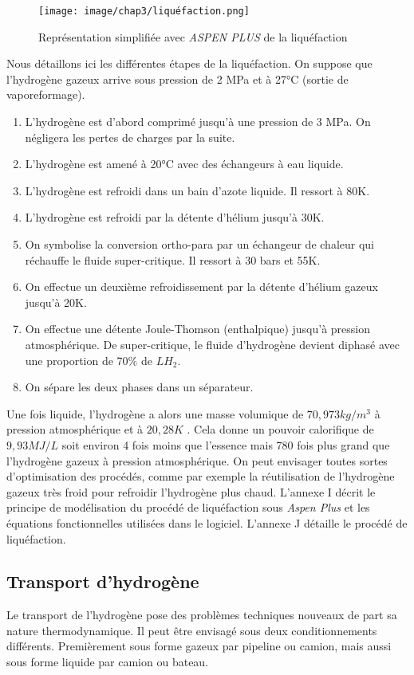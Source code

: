 \documentclass[11pt,french,a4paper]{article}
\begin{document}
\begin{figure}[h!]
\centering
\texttt{[image: image/chap3/liquéfaction.png]}
\caption{Représentation simplifiée avec \textit{ASPEN PLUS} de la liquéfaction}
\end{figure}

Nous détaillons ici les différentes étapes de la liquéfaction. On suppose que l'hydrogène gazeux arrive sous pression de 2 MPa et à 27°C (sortie de vaporeformage).
\begin{enumerate}
\item L'hydrogène est d'abord comprimé jusqu'à une pression de 3 MPa. On négligera les pertes de charges par la suite.
\item L'hydrogène est amené à 20°C avec des échangeurs à eau liquide.
\item L'hydrogène est refroidi dans un bain d'azote liquide. Il ressort à 80K.
\item L'hydrogène est refroidi par la détente d'hélium jusqu'à 30K.
\item On symbolise la conversion ortho-para par un échangeur de chaleur qui réchauffe le fluide super-critique. Il ressort à 30 bars et 55K.
\item On effectue un deuxième refroidissement par la détente d'hélium gazeux jusqu'à 20K.
\item On effectue une détente Joule-Thomson (enthalpique) jusqu'à pression atmosphérique. De super-critique, le fluide d'hydrogène devient diphasé avec une proportion de 70\% de $LH_2$.
\item On sépare les deux phases dans un séparateur.
\end{enumerate}


Une fois liquide, l'hydrogène a alors une masse volumique de $70,973 kg/m^3$ à pression atmosphérique et à $20,28K$ \cite{Surla2019}. Cela donne un pouvoir calorifique de $9,93 MJ/L$ soit environ 4 fois moins que l'essence mais 780 fois plus grand que l'hydrogène gazeux à pression atmosphérique. On peut envisager toutes sortes d'optimisation des procédés, comme par exemple la réutilisation de l'hydrogène gazeux très froid pour refroidir l'hydrogène plus chaud. L'annexe I décrit le principe de modélisation du procédé de liquéfaction sous \textit{Aspen Plus} et les équations fonctionnelles utilisées dans le logiciel.
L'annexe J détaille le procédé de liquéfaction.

\subsection{Transport d'hydrogène}
Le transport de l'hydrogène pose des problèmes techniques nouveaux de part sa nature thermodynamique. Il peut être envisagé sous deux conditionnements différents. Premièrement sous forme gazeux par pipeline ou camion, mais aussi sous forme liquide par camion ou bateau.
\end{document}
